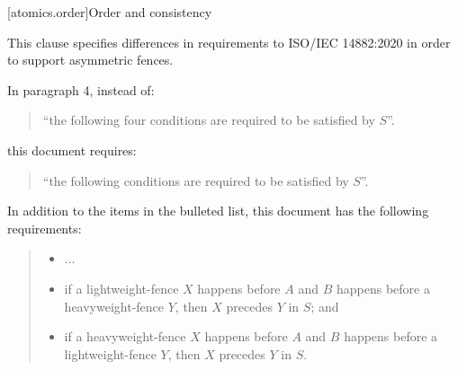 

[atomics.order]{Order and consistency}

This clause specifies differences in requirements to ISO/IEC 14882:2020
in order to support asymmetric fences.

In  paragraph 4, instead of:

\begin{quote}
``the following four conditions are required to be satisfied by $S$''.
\end{quote}

this document requires:

\begin{quote}
``the following conditions are required to be satisfied by $S$''.
\end{quote}

In addition to the items in the bulleted list, this document has the
following requirements:
\begin{quote}
\begin{itemize}
\item
  ...
\item
if a  lightweight-fence $X$ happens before $A$ and $B$ happens
before a  heavyweight-fence $Y$, then $X$ precedes $Y$ in $S$; and
\item  if a  heavyweight-fence $X$ happens before $A$ and $B$ happens
before a  lightweight-fence $Y$, then $X$ precedes $Y$ in $S$.
\end{itemize}
\end{quote}
